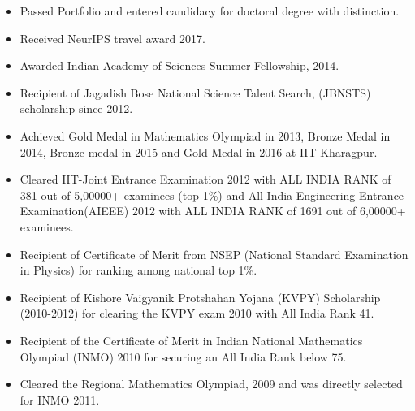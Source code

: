 \documentclass[9pt]{article}
\newenvironment{changemargin}[2]{%
  \begin{list}{}{%
    \setlength{\topsep}{0pt}%
    \setlength{\leftmargin}{0pt}%
    \setlength{\rightmargin}{#2}%
    \setlength{\listparindent}{\parindent}%
    \setlength{\itemindent}{\parindent}%
    \setlength{\parsep}{\parskip}%
  }%
  \item[]}{\end{list}
}
\newcommand{\lineover}{
	\begin{changemargin}{-0.05in}{-0.05in}
		\vspace*{-8pt}
		\hrulefill \\
		\vspace*{-2pt}
	\end{changemargin}
}
\newcommand{\header}[1]{
	\begin{changemargin}{-0.5in}{-0.5in}
		\scshape{#1}\\
  	\lineover
	\end{changemargin}
}
\newenvironment{body} {
	\vspace*{-16pt}
	\begin{changemargin}{-0.25in}{-0.5in}
  }	
	{\end{changemargin}
}
\begin{document}
          
\begin{body}
	\vspace{14pt}
        \begin{itemize} \itemsep -0pt
          \item Passed Portfolio and entered candidacy for doctoral degree with distinction.          
          \item Received NeurIPS travel award 2017.
          \item Awarded Indian Academy of Sciences Summer Fellowship, 2014. 
          \item Recipient of Jagadish Bose National Science Talent Search, (JBNSTS) scholarship since 2012.
          \item Achieved Gold Medal in Mathematics Olympiad in 2013, Bronze Medal in 2014, Bronze medal in 2015 and Gold Medal in 2016 at IIT Kharagpur. 
          \item Cleared IIT-Joint Entrance Examination 2012 with ALL INDIA RANK of 381 out of 5,00000+ examinees (top 1\%) and All India Engineering Entrance Examination(AIEEE) 2012 with ALL INDIA RANK of 1691 out of 6,00000+ examinees.
          \item Recipient of Certificate of Merit from NSEP (National Standard Examination in
Physics) for ranking among national top 1\%.
          \item Recipient of Kishore Vaigyanik Protshahan Yojana (KVPY) Scholarship (2010-2012) for clearing the KVPY exam 2010 with All India Rank 41. 
          \item Recipient of the Certificate of Merit in Indian National Mathematics Olympiad (INMO) 2010 for
securing an All India Rank below 75. 
          \item Cleared the Regional Mathematics Olympiad, 2009 and was directly selected for INMO 2011.  
        
        
        \end{itemize}
\end{body}
\smallskip



          
\end{document}
